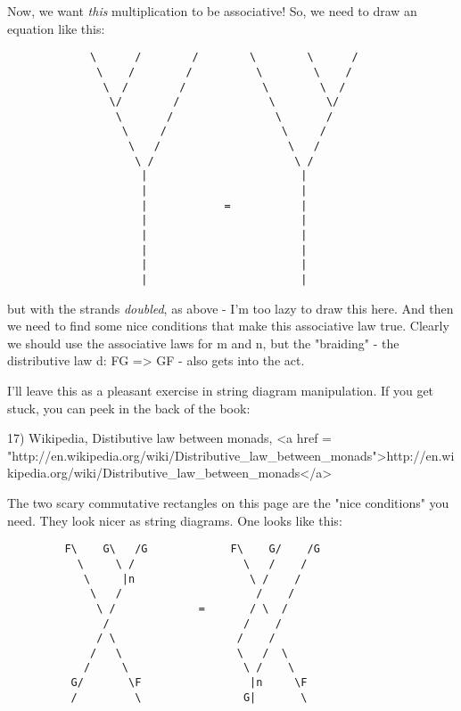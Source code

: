 Now, we want \emph{this} multiplication to be associative!  So, 
we need to draw an equation like this:

\begin{verbatim}
             \      /        /        \        \      /
              \    /        /          \        \    /
               \  /        /            \        \  /
                \/        /              \        \/
                 \       /                \       / 
                  \     /                  \     /
                   \   /                    \   /
                    \ /                      \ /
                     |                        |
                     |                        |
                     |            =           |
                     |                        |
                     |                        |
                     |                        |
                     |                        |
                     |                        | 
\end{verbatim}
    
but with the strands \emph{doubled}, as above - I'm too lazy
to draw this here.  And then we need to find some nice conditions
that make this associative law true.  Clearly we should use the
associative laws for m and n, but the "braiding" - the distributive
law d: FG => GF - also gets into the act.

I'll leave this as a pleasant exercise in string diagram 
manipulation.  If you get stuck, you can peek in the back of 
the book:

17) Wikipedia, Distibutive law between monads, 
<a href = "http://en.wikipedia.org/wiki/Distributive_law_between_monads">http://en.wikipedia.org/wiki/Distributive_law_between_monads</a>

The two scary commutative rectangles on this page are the 
"nice conditions" you need.    They look nicer as 
string diagrams.  One looks like this:

\begin{verbatim}
         F\    G\   /G             F\    G/    /G
           \     \ /                 \   /    /
            \     |n                  \ /    /
             \   /                     /    /
              \ /             =       / \  /
               /                     /    /
              / \                   /    /  
             /   \                  \   /  \
            /     \                  \ /    \
          G/       \F                 |n     \F
          /         \                G|       \

\end{verbatim}
    
